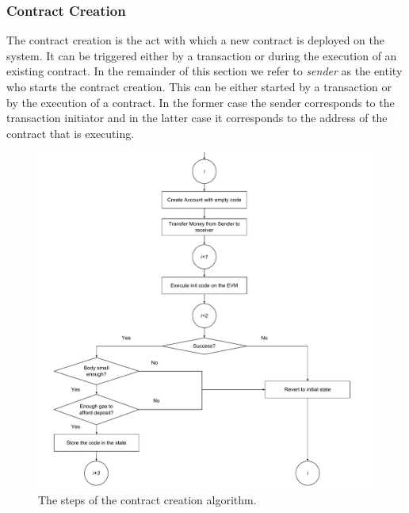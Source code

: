 \subsubsection{Contract Creation}
\label{sec:contract-creation}
The contract creation is the act with which a new contract is deployed
on the system. It can be triggered either by a transaction or during the 
execution of an existing contract. In the remainder of this section we refer
to \textit{sender} as the entity who starts the contract creation.
This can be either started by a transaction or by the
execution of a contract. In the former case the sender corresponds to the
transaction initiator and in the latter case it corresponds to the address
of the contract that is executing.

\begin{figure}
	\begin{center}
		\includegraphics[width=\textwidth]{./res/img/contract-creation.pdf}
	\end{center}
	\caption{The steps of the contract creation algorithm.}
	\label{fig:contract-creation}
\end{figure}

